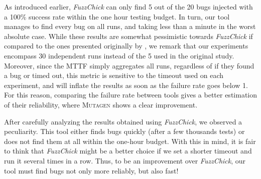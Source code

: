 \documentclass[sigconf, anonymous, review]{acmart}
\newcommand{\fuzzchick}{\textit{FuzzChick}\xspace}
\newcommand{\mutagen}{\textsc{Mutagen}\xspace}
\begin{document}
As introduced earlier, \fuzzchick can only find 5 out of the 20 bugs injected
with a 100\% success rate within the one hour testing budget.
%
In turn, our tool manages to find every bug on all runs, and taking less than a
minute in the worst absolute case.
%
While these results are somewhat pessimistic towards \fuzzchick if compared to
the ones presented originally by \citeauthor{lampropoulos2019coverage}, we
remark that our experiments encompass 30 independent runs instead of the 5 used
in the original study.
%
Moreover, since the MTTF simply aggregates all runs, regardless of if they found
a bug or timed out, this metric is sensitive to the timeout used on each
experiment, and will inflate the results as soon as the failure rate goes below
1.
%
For this reason, comparing the failure rate between tools gives a better
estimation of their reliability, where \mutagen shows a clear improvement.

After carefully analyzing the results obtained using \fuzzchick, we observed a
peculiarity.
%
This tool either finds bugs quickly (after a few thousands tests) or does not
find them at all within the one-hour budget.
%
With this in mind, it is fair to think that \fuzzchick might be a better choice
if we set a shorter timeout and run it several times in a row.
%
Thus, to be an improvement over \fuzzchick, our tool must find bugs not only
more reliably, but also fast!
\end{document}
